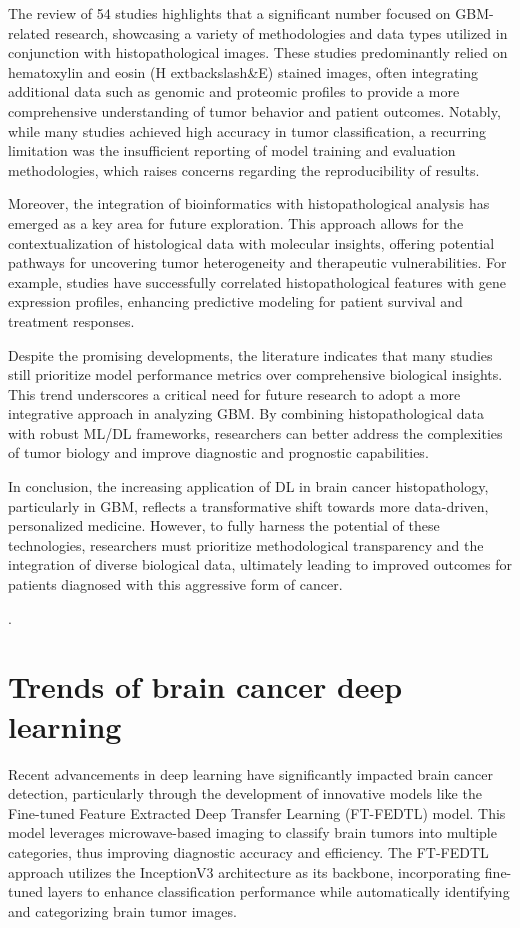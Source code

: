 \documentclass[runningheads]{llncs}
\begin{document}
The review of 54 studies highlights that a significant number focused on GBM-related research, showcasing a variety of methodologies and data types utilized in conjunction with histopathological images. These studies predominantly relied on hematoxylin and eosin (H	extbackslash{}\&E) stained images, often integrating additional data such as genomic and proteomic profiles to provide a more comprehensive understanding of tumor behavior and patient outcomes. Notably, while many studies achieved high accuracy in tumor classification, a recurring limitation was the insufficient reporting of model training and evaluation methodologies, which raises concerns regarding the reproducibility of results.

Moreover, the integration of bioinformatics with histopathological analysis has emerged as a key area for future exploration. This approach allows for the contextualization of histological data with molecular insights, offering potential pathways for uncovering tumor heterogeneity and therapeutic vulnerabilities. For example, studies have successfully correlated histopathological features with gene expression profiles, enhancing predictive modeling for patient survival and treatment responses.

Despite the promising developments, the literature indicates that many studies still prioritize model performance metrics over comprehensive biological insights. This trend underscores a critical need for future research to adopt a more integrative approach in analyzing GBM. By combining histopathological data with robust ML/DL frameworks, researchers can better address the complexities of tumor biology and improve diagnostic and prognostic capabilities.

In conclusion, the increasing application of DL in brain cancer histopathology, particularly in GBM, reflects a transformative shift towards more data-driven, personalized medicine. However, to fully harness the potential of these technologies, researchers must prioritize methodological transparency and the integration of diverse biological data, ultimately leading to improved outcomes for patients diagnosed with this aggressive form of cancer.

.
\section{Trends of brain cancer deep learning}
Recent advancements in deep learning have significantly impacted brain cancer detection, particularly through the development of innovative models like the Fine-tuned Feature Extracted Deep Transfer Learning (FT-FEDTL) model. This model leverages microwave-based imaging to classify brain tumors into multiple categories, thus improving diagnostic accuracy and efficiency. The FT-FEDTL approach utilizes the InceptionV3 architecture as its backbone, incorporating fine-tuned layers to enhance classification performance while automatically identifying and categorizing brain tumor images.
\end{document}
